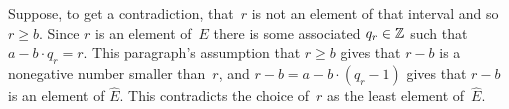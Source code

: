 \documentclass{ibl}  %
\begin{document}
\begin{problem}
\begin{exes}
\begin{answer}
  Suppose, to get a contradiction, that~$r$ is not 
  an element of that interval and so $r\geq b$.
  Since $r$ is an element of~$E$ there is some associated
  $q_r\in\mathbb{Z}$ such that $a-b\cdot q_r=r$.
  This paragraph's assumption that $r\geq b$
  gives that $r-b$ is a nonegative number smaller than~$r$, and
  $r-b=a-b\cdot (q_r-1)$ gives that $r-b$ is an element of $\hat{E}$.
  This contradicts the choice of~$r$ as the least element of~$\hat{E}$.
\end{answer}
\end{exes}



\end{problem}
\end{document}

